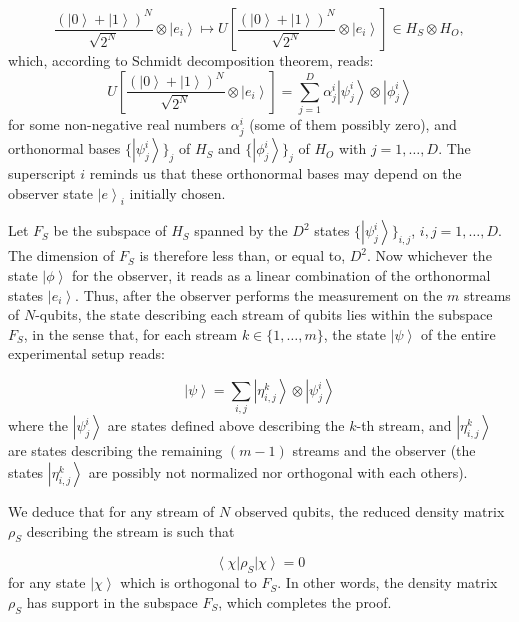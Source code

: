 \documentclass[11pt,amsmath,amssymb,latexsym,a4paper]{article}
\newcommand{\ket}[1]{\left|{#1}\right>}
\newcommand{\bra}[1]{\left<{#1}\right|}
\newcommand{\highlight}[1] {#1}
\begin{document}
\begin{equation}
\frac{(\ket{0}+\ket{1})^N}{\sqrt{2^N}}\otimes\ket{e_i}\mapsto U\highlight{\left[\frac{(\ket{0}+\ket{1})^N}{\sqrt{2^N}}\otimes\ket{e_i}\right]}\in H_S\otimes H_O,
\end{equation}
which, according to Schmidt decomposition theorem, reads:
\begin{equation}
U\highlight{\left[\frac{(\ket{0}+\ket{1})^N}{\sqrt{2^N}}\otimes\ket{e_i}\right]} = \sum_{j=1}^D \alpha^i_j \ket{\psi^i_j}\otimes \ket{\phi^i_j}
\end{equation}
for some non-negative real numbers $\alpha^i_j$ (some of them possibly zero), and orthonormal bases $\{\ket{\psi^i_j}\}_j$ of $H_S$ and $\{\ket{\phi^i_j}\}_j$ of $H_O$ with $j=1,\ldots,D$. The superscript $i$ reminds us that these orthonormal bases may depend on the observer state $\ket{e}_i$ initially chosen.

Let $F_S$ be the subspace of $H_S$ spanned by the $D^2$ states $\{ \ket{\psi^i_j} \}_{i,j}$, $i, j=1,\ldots
,D$. The dimension of $F_S$ is therefore less than, or equal to, $D^2$. Now whichever the state $\ket{\phi}$ for the observer, it reads as a linear combination of the orthonormal states $\ket{e_i}$. Thus, after the observer performs the measurement on the $m$ streams of $N$-qubits, the state describing each stream of qubits lies within the subspace $F_S$, in the sense that, for each stream $k\in\{1,\ldots,m\}$, the state $\ket{\psi}$ of the entire experimental setup reads:

\begin{equation}
\ket{\psi} = \sum_{i,j}\ket{\eta^k_{i,j}}\otimes \ket{\psi^i_j}
\end{equation}
where the $\ket{\psi^i_j}$ are states defined above describing the $k$-th stream, and $\ket{\eta^k_{i,j}}$ are states describing the remaining $(m-1)$ streams and the observer (the states $\ket{\eta^k_{i,j}}$ are possibly not normalized nor orthogonal with each others).

We deduce that for any stream of $N$ observed qubits, the reduced density matrix $\rho_S$ describing the stream is such that

\begin{equation}
\bra{\chi}\rho_S\ket{\chi} = 0
\end{equation}
for any state $\ket{\chi}$ which is orthogonal to $F_S$. In other words, the density matrix $\rho_S$ has support in the subspace $F_S$, which completes the proof.
\end{document}

